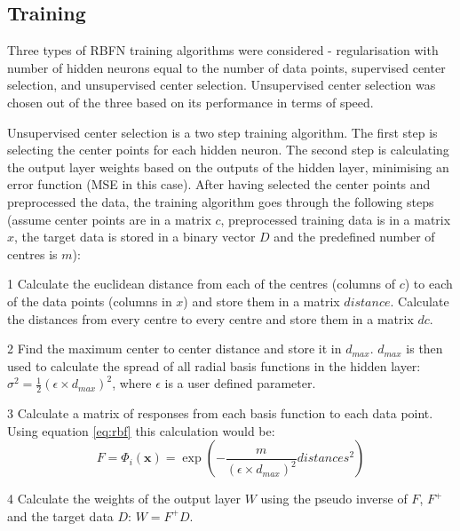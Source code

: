 \documentclass[a4paper, 11pt]{article}
\begin{document}
\subsection{Training}
Three types of RBFN training algorithms were considered - regularisation with number of hidden neurons equal to the number of data points, supervised center selection, and unsupervised center selection. Unsupervised center selection was chosen out of the three based on its performance in terms of speed.

Unsupervised center selection is a two step training algorithm. The first step is selecting the center points for each hidden neuron. The second step is  calculating the output layer weights based on the outputs of the hidden layer, minimising an error function (MSE in this case). After having selected the center points and preprocessed the data, the training algorithm goes through the following steps (assume center points are in a matrix $c$, preprocessed training data is in a matrix $x$, the target data is stored in a binary vector $D$ and the predefined number of centres is $m$):
\begin{list}{•}{•}
\item[1] Calculate the euclidean distance from each of the centres (columns of $c$) to each of the data points (columns in $x$) and store them in a matrix $distance$. Calculate the distances from every centre to every centre and store them in a matrix $dc$.  
\item[2] Find the maximum center to center distance and store it in $d_{max}$. $d_{max}$ is then used to calculate the spread of all radial basis functions in the hidden layer: $\sigma^2 = \frac{1}{2}(\epsilon \times d_{max})^2$, where $\epsilon$ is a user defined parameter. 
\item[3] Calculate a matrix of responses from each basis function to each data point. Using equation \ref{eq:rbf} this calculation would be:
\begin{equation}
F = \Phi_i(\boldsymbol{x}) = \exp\left(-\frac{m}{(\epsilon \times d_{max})^2} distances^2 \right)  
\end{equation}
\item[4] Calculate the weights of the output layer $W$ using the pseudo inverse of $F$, $F^+$ and the target data $D$: $W= F^+D$.
\end{list}
\end{document}
